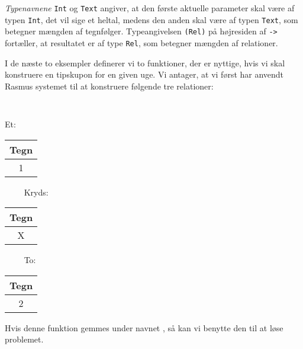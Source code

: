 {\em Typenavnene\/} \verb"Int" og \verb"Text" angiver, at den f\o{}rste
aktuelle parameter skal v\ae{}re af typen \verb"Int", det vil sige et heltal,
medens den anden skal v\ae{}re af typen \verb"Text", som betegner
m\ae{}ngden af tegnf\o{}lger. Typeangivelsen \verb"(Rel)" p\aa{}
h\o{}jresiden af \verb"->" fort\ae{}ller, at resultatet er af type
\verb"Rel", som betegner m\ae{}ngden af relationer.

I de n\ae{}ste to eksempler definerer vi to funktioner, der er nyttige, hvis
vi skal konstruere en tipskupon for en given uge. Vi antager, at vi f\o{}rst
har anvendt {\sc Rasmus} systemet til at konstruere f\o{}lgende
tre relationer:
{\tt
\begin{center}
Et:~\begin{tabular}{|c|} \hline Tegn \\\hline 1 \\\hline\end{tabular}~~~~
Kryds:~\begin{tabular}{|c|} \hline Tegn \\\hline X \\\hline\end{tabular}~~~~
To:~\begin{tabular}{|c|} \hline Tegn \\\hline 2 \\\hline\end{tabular}
\end{center}
}


Hvis denne funktion gemmes under navnet , s\aa{} kan vi
benytte den til at l\o{}se problemet.

